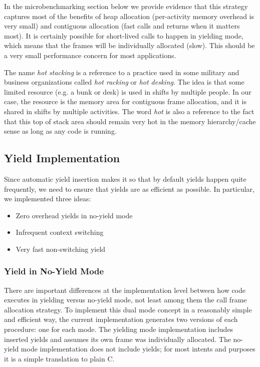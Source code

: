 \documentclass[pldi,10pt,preprint]{sigplanconf-pldi16}
\begin{document}
In the microbenchmarking section below we provide evidence that this strategy captures most of the benefits of heap allocation (per-activity memory overhead is very small) and contiguous allocation (fast calls and returns when it matters most).
It is certainly possible for short-lived calls to happen in yielding mode, which means that the frames will be individually allocated (slow).
This should be a very small performance concern for most applications.

The name \emph{hot stacking} is a reference to a practice used in some military and business organizations called \emph{hot racking} or \emph{hot desking}.
The idea is that some limited resource (e.g. a bunk or desk) is used in shifts by multiple people.
In our case, the resource is the memory area for contiguous frame allocation, and it is shared in shifts by multiple activities.
The word \emph{hot} is also a reference to the fact that this top of stack area should remain very hot in the memory hierarchy/cache sense as long as any code is running.

\subsection{Yield Implementation}

Since automatic yield insertion makes it so that by default yields happen quite frequently, we need to ensure that yields are as efficient as possible.
In particular, we implemented three ideas:

\begin{itemize}
\item Zero overhead yields in no-yield mode
\item Infrequent context switching
\item Very fast non-switching yield
\end{itemize}

\subsubsection{Yield in No-Yield Mode}

There are important differences at the implementation level between how code executes in yielding versus no-yield mode, not least among them the call frame allocation strategy.
To implement this dual mode concept in a reasonably simple and efficient way, the current \charcoal{} implementation generates two versions of each procedure: one for each mode.
The yielding mode implementation includes inserted yields and assumes its own frame was individually allocated.
The no-yield mode implementation does not include yields; for most intents and purposes it is a simple translation to plain C.
\end{document}
